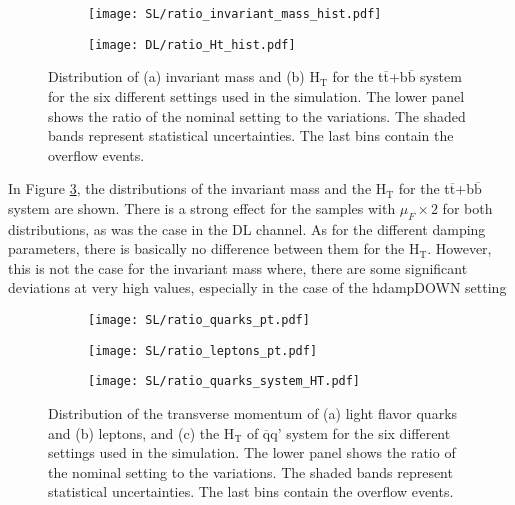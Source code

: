 \begin{figure}[H]
    \centering
    \begin{subfigure}{0.49\textwidth}
        \centering
        \texttt{[image: SL/ratio\_invariant\_mass\_hist.pdf]}
        \caption{}
        \label{subfig:m(ttbb)_SL}        
    \end{subfigure}
    \hfill
    \begin{subfigure}{0.49\linewidth}
        \centering
        \texttt{[image: DL/ratio\_Ht\_hist.pdf]}
        \caption{}
        \label{subfig:HT(ttbb)_SL}
    \end{subfigure}
    \caption{Distribution of (a) invariant mass and (b) H$_{\text{T}}$ for the t$\overline{\text{t}}$+b$\overline{\text{b}}$ system for the six different settings used in the simulation. The lower panel shows the ratio of the nominal setting to the variations. The shaded bands represent statistical uncertainties. The last bins contain the overflow events.}
    \label{fig:ttbb_SL}
\end{figure}
In Figure \ref{fig:ttbb_SL}, the distributions of the invariant mass and the H$_{\text{T}}$ for the t$\overline{\text{t}}$+b$\overline{\text{b}}$ system are shown. There is a strong effect for the samples with $\mu_F \times 2$ for both distributions, as was the case in the DL channel. As for the different damping parameters, there is basically no difference between them for the H$_{\text{T}}$. However, this is not the case for the invariant mass where, there are some significant deviations at very high values, especially in the case of the hdampDOWN setting 
\begin{figure}[H]
    \centering
    \begin{subfigure}{0.49\textwidth}
        \centering
        \texttt{[image: SL/ratio\_quarks\_pt.pdf]}
        \caption{}
        \label{subfig:pt(quarks)_SL}        
    \end{subfigure}
    \hfill
    \begin{subfigure}{0.49\linewidth}
        \centering
        \texttt{[image: SL/ratio\_leptons\_pt.pdf]}
        \caption{}
        \label{subfig:pt(leptons)_SL}
    \end{subfigure}
    \hfill
    \begin{subfigure}{0.49\linewidth}
        \centering
        \texttt{[image: SL/ratio\_quarks\_system\_HT.pdf]}
        \caption{}
        \label{subfig:HT(qq)_SL}
    \end{subfigure}
    \caption{Distribution of the transverse momentum of (a) light flavor quarks and (b) leptons, and (c) the H$_{\text{T}}$ of $\overline{\text{q}}$q' system for the six different settings used in the simulation. The lower panel shows the ratio of the nominal setting to the variations. The shaded bands represent statistical uncertainties. The last bins contain the overflow events.}
    \label{fig:quarks_leptons_SL}
\end{figure}
